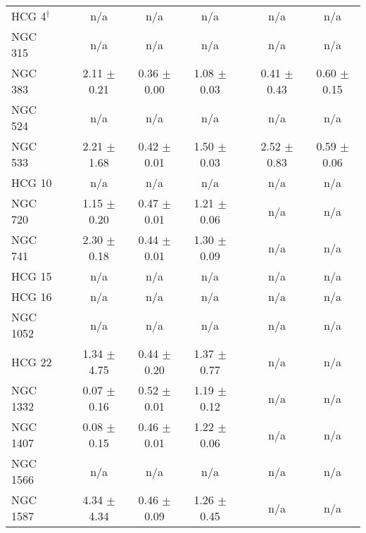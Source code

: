 \begin{table*}
\begin{center}
\begin{tabular}{@{}l@{}c@{\hspace{0.6cm}}ccc@{}c@{\hspace{0.6cm}}cc@{}}
HCG 4$^{\dagger}$     & &  n/a               &  n/a              &  n/a              & &  n/a               &  n/a              \\
NGC 315               & &  n/a               &  n/a              &  n/a              & &  n/a               &  n/a              \\
NGC 383               & &  2.11  $\pm$ 0.21  &  0.36 $\pm$ 0.00  &  1.08 $\pm$ 0.03  & &  0.41  $\pm$ 0.43  &  0.60 $\pm$ 0.15  \\
NGC 524               & &  n/a               &  n/a              &  n/a              & &  n/a               &  n/a              \\
NGC 533               & &  2.21  $\pm$ 1.68  &  0.42 $\pm$ 0.01  &  1.50 $\pm$ 0.03  & &  2.52  $\pm$ 0.83  &  0.59 $\pm$ 0.06  \\
HCG 10                & &  n/a               &  n/a              &  n/a              & &  n/a               &  n/a              \\
NGC 720               & &  1.15  $\pm$ 0.20  &  0.47 $\pm$ 0.01  &  1.21 $\pm$ 0.06  & &  n/a               &  n/a              \\
NGC 741               & &  2.30  $\pm$ 0.18  &  0.44 $\pm$ 0.01  &  1.30 $\pm$ 0.09  & &  n/a               &  n/a              \\
HCG 15                & &  n/a               &  n/a              &  n/a              & &  n/a               &  n/a              \\
HCG 16                & &  n/a               &  n/a              &  n/a              & &  n/a               &  n/a              \\
NGC 1052              & &  n/a               &  n/a              &  n/a              & &  n/a               &  n/a              \\
HCG 22                & &  1.34  $\pm$ 4.75  &  0.44 $\pm$ 0.20  &  1.37 $\pm$ 0.77  & &  n/a               &  n/a              \\
NGC 1332              & &  0.07  $\pm$ 0.16  &  0.52 $\pm$ 0.01  &  1.19 $\pm$ 0.12  & &  n/a               &  n/a              \\
NGC 1407              & &  0.08  $\pm$ 0.15  &  0.46 $\pm$ 0.01  &  1.22 $\pm$ 0.06  & &  n/a               &  n/a              \\
NGC 1566              & &  n/a               &  n/a              &  n/a              & &  n/a               &  n/a              \\
NGC 1587              & &  4.34  $\pm$ 4.34  &  0.46 $\pm$ 0.09  &  1.26 $\pm$ 0.45  & &  n/a               &  n/a              \\

\end{tabular}
\end{center}
\end{table*}
